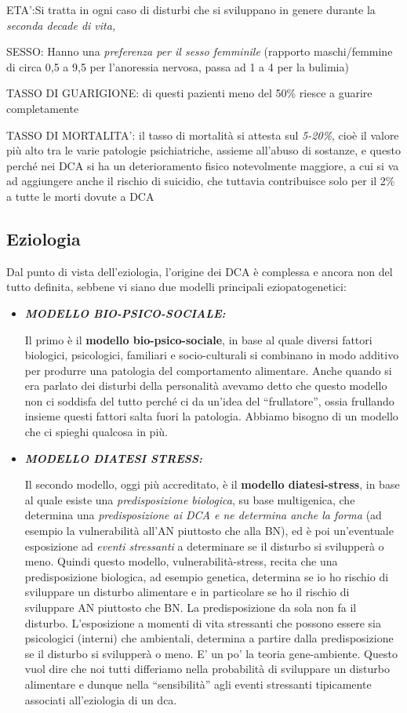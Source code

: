 ETA':Si tratta in ogni caso di disturbi che si sviluppano in genere
durante la \emph{seconda decade di vita,}

SESSO: Hanno una \emph{preferenza per il sesso femminile} (rapporto
maschi/femmine di circa 0,5 a 9,5 per l'anoressia nervosa, passa ad 1 a
4 per la bulimia)

TASSO DI GUARIGIONE: di questi pazienti meno del 50\% riesce a guarire
completamente

TASSO DI MORTALITA': il tasso di mortalità si attesta sul \emph{5-20\%},
cioè il valore più alto tra le varie patologie psichiatriche, assieme
all'abuso di sostanze, e questo perché nei DCA si ha un deterioramento
fisico notevolmente maggiore, a cui si va ad aggiungere anche il rischio
di suicidio, che tuttavia contribuisce solo per il 2\% a tutte le morti
dovute a DCA

\subsection{Eziologia}

Dal punto di vista dell'eziologia, l'origine dei DCA è complessa e
ancora non del tutto definita, sebbene vi siano due modelli principali
eziopatogenetici:

\begin{itemize}
\item
  \textbf{\emph{MODELLO BIO-PSICO-SOCIALE:}}

  Il primo è il \textbf{modello bio-psico-sociale}, in base al quale
  diversi fattori biologici, psicologici, familiari e socio-culturali si
  combinano in modo additivo per produrre una patologia del
  comportamento alimentare. Anche quando si era parlato dei disturbi
  della personalità avevamo detto che questo modello non ci soddisfa del
  tutto perché ci da un'idea del ``frullatore'', ossia frullando insieme
  questi fattori salta fuori la patologia. Abbiamo bisogno di un modello
  che ci spieghi qualcosa in più.
\item
  \textbf{\emph{MODELLO DIATESI STRESS:}}

  Il secondo modello, oggi più accreditato, è il \textbf{modello
  diatesi-stress}, in base al quale esiste una \emph{predisposizione
  biologica}, su base multigenica, che determina una
  \emph{predisposizione ai DCA e ne determina anche la forma} (ad
  esempio la vulnerabilità all'AN piuttosto che alla BN), ed è poi
  un'eventuale esposizione ad \emph{eventi stressanti} a determinare se
  il disturbo si svilupperà o meno. Quindi questo modello,
  vulnerabilità-stress, recita che una predisposizione biologica, ad
  esempio genetica, determina se io ho rischio di sviluppare un disturbo
  alimentare e in particolare se ho il rischio di sviluppare AN
  piuttosto che BN. La predisposizione da sola non fa il disturbo.
  L'esposizione a momenti di vita stressanti che possono essere sia
  psicologici (interni) che ambientali, determina a partire dalla
  predisposizione se il disturbo si svilupperà o meno. E' un po' la
  teoria gene-ambiente. Questo vuol dire che noi tutti differiamo nella
  probabilità di sviluppare un disturbo alimentare e dunque nella
  ``sensibilità'' agli eventi stressanti tipicamente associati
  all'eziologia di un dca.
\end{itemize}

